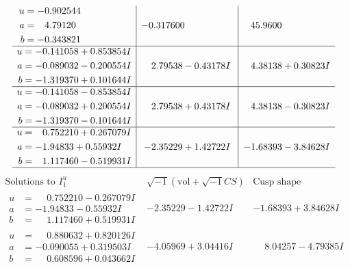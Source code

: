 \documentclass[1p]{elsarticle_modified}
\theoremstyle{definition}
\newcommand{\I}{\sqrt{-1}}
\begin{document}
$$\begin{array}{c|c|c}
\begin{aligned}
u &= -0.902544\phantom{ +0.000000I} \\
a &= \phantom{-}4.79120\phantom{ +0.000000I} \\
b &= -0.343821\phantom{ +0.000000I}\end{aligned}
 & -0.317600\phantom{ +0.000000I} & \phantom{-}45.9600\phantom{ +0.000000I} \\ \hline\begin{aligned}
u &= -0.141058 + 0.853854 I \\
a &= -0.089032 - 0.200554 I \\
b &= -1.319370 + 0.101644 I\end{aligned}
 & \phantom{-}2.79538 - 0.43178 I & \phantom{-}4.38138 + 0.30823 I \\ \hline\begin{aligned}
u &= -0.141058 - 0.853854 I \\
a &= -0.089032 + 0.200554 I \\
b &= -1.319370 - 0.101644 I\end{aligned}
 & \phantom{-}2.79538 + 0.43178 I & \phantom{-}4.38138 - 0.30823 I \\ \hline\begin{aligned}
u &= \phantom{-}0.752210 + 0.267079 I \\
a &= -1.94833 + 0.55932 I \\
b &= \phantom{-}1.117460 - 0.519931 I\end{aligned}
 & -2.35229 + 1.42722 I & -1.68393 - 3.84628 I\\
 \hline 
 \end{array}$$\newpage$$\begin{array}{c|c|c}  
\text{Solutions to }I^u_{1}& \I (\text{vol} + \sqrt{-1}CS) & \text{Cusp shape}\\
 \hline 
\begin{aligned}
u &= \phantom{-}0.752210 - 0.267079 I \\
a &= -1.94833 - 0.55932 I \\
b &= \phantom{-}1.117460 + 0.519931 I\end{aligned}
 & -2.35229 - 1.42722 I & -1.68393 + 3.84628 I \\ \hline\begin{aligned}
u &= \phantom{-}0.880632 + 0.820126 I \\
a &= -0.090055 + 0.319503 I \\
b &= \phantom{-}0.608596 + 0.043662 I\end{aligned}
 & -4.05969 + 3.04416 I & \phantom{-}8.04257 - 4.79385 I \\ \hline\begin{aligned}

\end{aligned}
\end{array}$$
\end{document}
